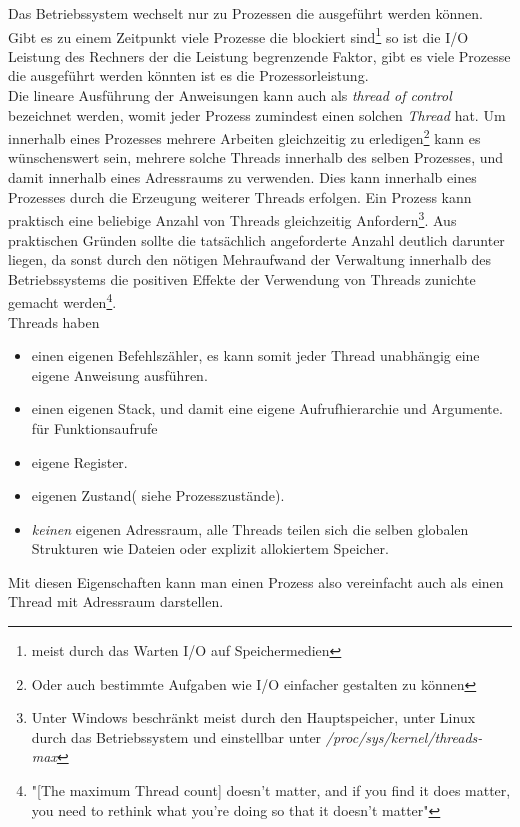 Das Betriebssystem wechselt nur zu Prozessen die ausgeführt werden können. Gibt es zu einem Zeitpunkt viele Prozesse die blockiert sind\footnote{meist durch das Warten I/O auf Speichermedien} so ist die I/O Leistung des Rechners der die Leistung begrenzende Faktor, gibt es viele Prozesse die ausgeführt werden könnten ist es die Prozessorleistung.
\\Die lineare Ausführung der Anweisungen kann auch als \emph{thread of control} bezeichnet werden, womit jeder Prozess zumindest einen solchen \emph{Thread} hat. Um innerhalb eines Prozesses mehrere Arbeiten gleichzeitig zu erledigen\footnote{Oder auch bestimmte Aufgaben wie I/O einfacher gestalten zu können} kann es wünschenswert sein, mehrere solche Threads innerhalb des selben Prozesses, und damit innerhalb eines Adressraums zu verwenden. Dies kann innerhalb eines Prozesses durch die Erzeugung weiterer Threads erfolgen. Ein Prozess kann praktisch eine beliebige Anzahl von Threads gleichzeitig Anfordern\footnote{Unter Windows beschränkt meist durch den Hauptspeicher, unter Linux durch das Betriebssystem und einstellbar unter \textit{/proc/sys/kernel/threads-max}}. Aus praktischen Gründen sollte die tatsächlich angeforderte Anzahl deutlich darunter liegen, da sonst durch den nötigen Mehraufwand der Verwaltung innerhalb des Betriebssystems die positiven Effekte der Verwendung von Threads zunichte gemacht werden\footnote{"[The maximum Thread count] doesn't matter, and if you find it does matter, you need to rethink what you're doing so that it doesn't matter"\parencite{stacko_threadcount}}.
\\Threads haben \parencite[S. 148]{tanenbaum2016}
\begin{itemize}
	\item einen eigenen Befehlszähler, es kann somit jeder Thread unabhängig eine eigene Anweisung ausführen.
	\item einen eigenen Stack, und damit eine eigene Aufrufhierarchie und Argumente. für Funktionsaufrufe
	\item eigene Register.
	\item eigenen Zustand( siehe Prozesszustände).
	\item \emph{keinen} eigenen Adressraum, alle Threads teilen sich die selben globalen Strukturen wie Dateien oder explizit allokiertem Speicher.
\end{itemize}	
Mit diesen Eigenschaften kann man einen Prozess also vereinfacht auch als einen Thread mit Adressraum darstellen.\parencite[S. 1]{butenhof1997}
